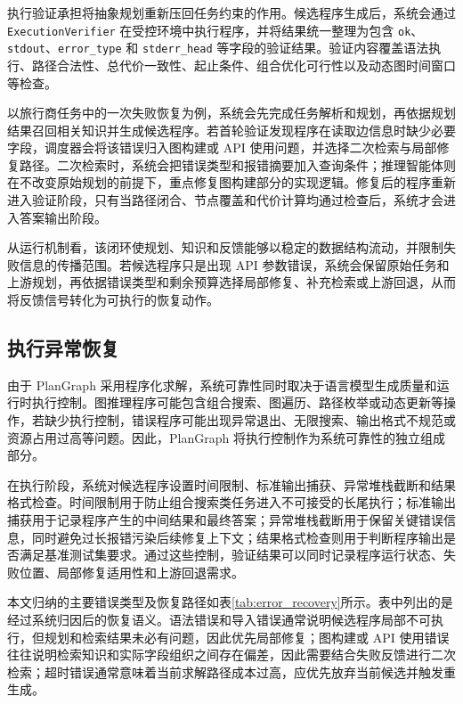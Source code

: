 执行验证承担将抽象规划重新压回任务约束的作用。候选程序生成后，系统会通过 \texttt{ExecutionVerifier} 在受控环境中执行程序，并将结果统一整理为包含 \texttt{ok}、\texttt{stdout}、\texttt{error\_type} 和 \texttt{stderr\_head} 等字段的验证结果。验证内容覆盖语法执行、路径合法性、总代价一致性、起止条件、组合优化可行性以及动态图时间窗口等检查。

以旅行商任务中的一次失败恢复为例，系统会先完成任务解析和规划，再依据规划结果召回相关知识并生成候选程序。若首轮验证发现程序在读取边信息时缺少必要字段，调度器会将该错误归入图构建或 API 使用问题，并选择二次检索与局部修复路径。二次检索时，系统会把错误类型和报错摘要加入查询条件；推理智能体则在不改变原始规划的前提下，重点修复图构建部分的实现逻辑。修复后的程序重新进入验证阶段，只有当路径闭合、节点覆盖和代价计算均通过检查后，系统才会进入答案输出阶段。

从运行机制看，该闭环使规划、知识和反馈能够以稳定的数据结构流动，并限制失败信息的传播范围。若候选程序只是出现 API 参数错误，系统会保留原始任务和上游规划，再依据错误类型和剩余预算选择局部修复、补充检索或上游回退，从而将反馈信号转化为可执行的恢复动作。

\subsection{执行异常恢复}

由于 PlanGraph 采用程序化求解，系统可靠性同时取决于语言模型生成质量和运行时执行控制。图推理程序可能包含组合搜索、图遍历、路径枚举或动态更新等操作，若缺少执行控制，错误程序可能出现异常退出、无限搜索、输出格式不规范或资源占用过高等问题。因此，PlanGraph 将执行控制作为系统可靠性的独立组成部分。

在执行阶段，系统对候选程序设置时间限制、标准输出捕获、异常堆栈截断和结果格式检查。时间限制用于防止组合搜索类任务进入不可接受的长尾执行；标准输出捕获用于记录程序产生的中间结果和最终答案；异常堆栈截断用于保留关键错误信息，同时避免过长报错污染后续修复上下文；结果格式检查则用于判断程序输出是否满足基准测试集要求。通过这些控制，验证结果可以同时记录程序运行状态、失败位置、局部修复适用性和上游回退需求。

本文归纳的主要错误类型及恢复路径如表\ref{tab:error_recovery}所示。表中列出的是经过系统归因后的恢复语义。语法错误和导入错误通常说明候选程序局部不可执行，但规划和检索结果未必有问题，因此优先局部修复；图构建或 API 使用错误往往说明检索知识和实际字段组织之间存在偏差，因此需要结合失败反馈进行二次检索；超时错误通常意味着当前求解路径成本过高，应优先放弃当前候选并触发重生成。

